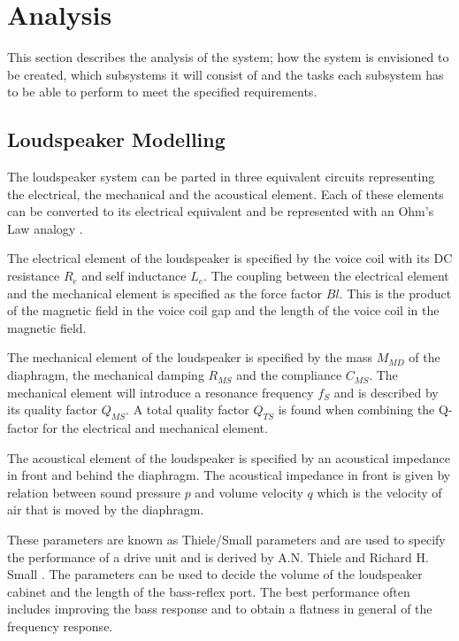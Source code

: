 
\chapter{Analysis}
This section describes the analysis of the system; how the system is envisioned to be created, which subsystems it will consist of and the tasks each subsystem has to be able to perform to meet the specified requirements.

\section{Loudspeaker Modelling}
The loudspeaker system can be parted in three equivalent circuits representing the electrical, the mechanical and the acoustical element. Each of these elements can be converted to its electrical equivalent and be represented with an Ohm's Law analogy \cite[p.~115]{Elektroakustik}.

The electrical element of the loudspeaker is specified by the voice coil with its DC resistance $R_e$ and self inductance $L_e$. The coupling between the electrical element and the mechanical element is specified as the force factor $Bl$. This is the product of the magnetic field in the voice coil gap and the length of the voice coil in the magnetic field. \cite[p.~34]{Elektroakustik}

The mechanical element of the loudspeaker is specified by the mass $M_{MD}$ of the diaphragm, the mechanical damping $R_{MS}$ and the compliance $C_{MS}$. The mechanical element will introduce a resonance frequency $f_S$ and is described by its quality factor $Q_{MS}$. A total quality factor $Q_{TS}$ is found when combining the Q-factor for the electrical and mechanical element.

The acoustical element of the loudspeaker is specified by an acoustical impedance in front and behind the diaphragm. The acoustical impedance in front is given by relation between sound pressure $p$ and volume velocity $q$ which is the velocity of air that is moved by the diaphragm. 

These parameters are known as Thiele/Small parameters and are used to specify the performance of a drive unit and is derived by A.N. Thiele \cite{thiele1971loudspeakers} and Richard H. Small \cite{small1972closed}.
The parameters can be used to decide the volume of the loudspeaker cabinet and the length of the bass-reflex port. The best performance often includes improving the bass response and to obtain a flatness in general of the frequency response. \\

